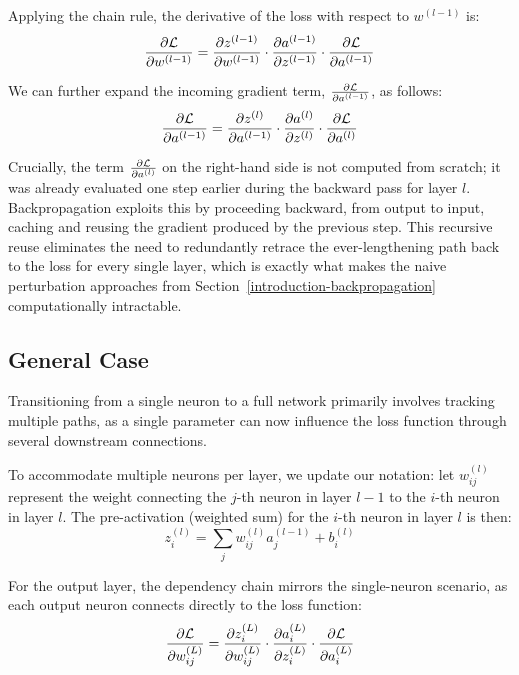 Applying the chain rule, the derivative of the loss with respect to $w^{(l-1)}$ is:
\begin{equation*}
    \frac{\partial \mathcal{L}}{\partial w^{(l-1)}} = \frac{\partial z^{(l-1)}}{\partial w^{(l-1)}} \cdot \frac{\partial a^{(l-1)}}{\partial z^{(l-1)}} \cdot \frac{\partial \mathcal{L}}{\partial a^{(l-1)}}
\end{equation*}

We can further expand the incoming gradient term, $\frac{\partial \mathcal{L}}{\partial a^{(l-1)}}$, as follows:
\begin{equation*}
    \frac{\partial \mathcal{L}}{\partial a^{(l-1)}} = \frac{\partial z^{(l)}}{\partial a^{(l-1)}} \cdot \frac{\partial a^{(l)}}{\partial z^{(l)}} \cdot \frac{\partial \mathcal{L}}{\partial a^{(l)}}
\end{equation*}

Crucially, the term $\frac{\partial \mathcal{L}}{\partial a^{(l)}}$ on the right-hand side is not computed from scratch; it was already evaluated one step earlier during the backward pass for layer $l$. 
Backpropagation exploits this by proceeding backward, from output to input, caching and reusing the gradient produced by the previous step. 
This recursive reuse eliminates the need to redundantly retrace the ever-lengthening path back to the loss for every single layer, which is exactly what makes the naive perturbation approaches from Section~\ref{introduction-backpropagation} computationally intractable.

\subsection{General Case}
Transitioning from a single neuron to a full network primarily involves tracking multiple paths, as a single parameter can now influence the loss function through several downstream connections. 

To accommodate multiple neurons per layer, we update our notation: let $w_{ij}^{(l)}$ represent the weight connecting the $j$-th neuron in layer $l-1$ to the $i$-th neuron in layer $l$. The pre-activation (weighted sum) for the $i$-th neuron in layer $l$ is then:
\begin{equation*}
    z_i^{(l)} = \sum_{j} w_{ij}^{(l)} a_j^{(l-1)} + b_i^{(l)}
\end{equation*}

For the output layer, the dependency chain mirrors the single-neuron scenario, as each output neuron connects directly to the loss function:
\begin{equation*}
    \frac{\partial \mathcal{L}}{\partial w_{ij}^{(L)}} = \frac{\partial z_i^{(L)}}{\partial w_{ij}^{(L)}} \cdot \frac{\partial a_i^{(L)}}{\partial z_i^{(L)}} \cdot \frac{\partial \mathcal{L}}{\partial a_i^{(L)}}
\end{equation*}

